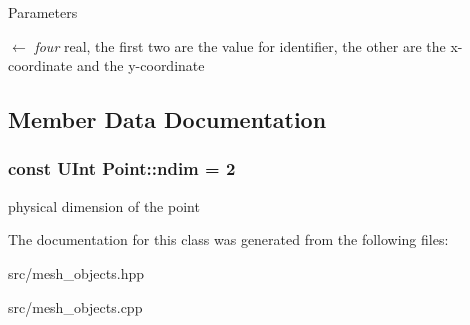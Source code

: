 \begin{DoxyParams}{Parameters}
\item[\mbox{$\leftarrow$} {\em four}]real, the first two are the value for identifier, the other are the x-\/coordinate and the y-\/coordinate \end{DoxyParams}


\subsection{Member Data Documentation}
\hypertarget{classPoint_ac784604377be8075032dcc79d14d7e8b}{
\subsubsection[{ndim}]{\setlength{\rightskip}{0pt plus 5cm}const UInt {\bf Point::ndim} = 2}}
\label{classPoint_ac784604377be8075032dcc79d14d7e8b}
physical dimension of the point 

The documentation for this class was generated from the following files:\begin{DoxyCompactItemize}
\item 
src/mesh\_\-objects.hpp\item 
src/mesh\_\-objects.cpp\end{DoxyCompactItemize}
